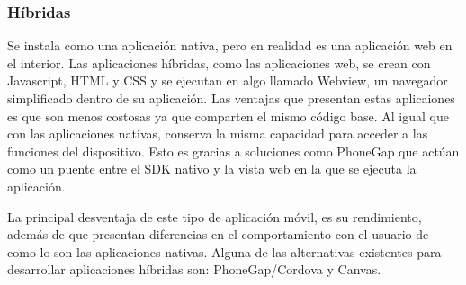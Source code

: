 	\subsubsection{Híbridas}
	Se instala como una aplicación nativa, pero en realidad es una aplicación web en el interior. Las aplicaciones híbridas, como las aplicaciones web, se crean con Javascript, HTML y CSS y se ejecutan en algo llamado Webview, un navegador simplificado dentro de su aplicación. 
	Las ventajas que presentan estas aplicaiones es que son menos costosas ya que comparten el mismo código base. Al igual que con las aplicaciones nativas, conserva la misma capacidad para acceder a las funciones del dispositivo. Esto es gracias a soluciones como PhoneGap que actúan como un puente entre el SDK nativo y la vista web en la que se ejecuta la aplicación. 
	
	La principal desventaja de este tipo de aplicación móvil, es su rendimiento, además de que presentan diferencias en el comportamiento con el usuario de como lo son las aplicaciones nativas. Alguna de las alternativas existentes para desarrollar aplicaciones híbridas son: PhoneGap/Cordova y Canvas.


